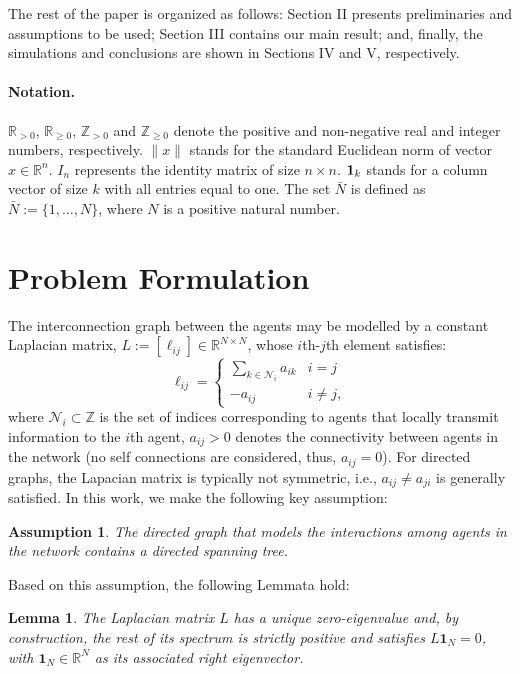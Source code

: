 \documentclass[journal,twoside]{IEEEtran}
\newtheorem{lemma}{Lemma}
\newtheorem{assumption}{Assumption}
\def\rea{\mathbb{R}}
\def\rea{\mathbb{R}}
\def\intnum{\mathbb{Z}}
\def\intnum{\mathbb{Z}}
\begin{document}
The rest of the paper is organized as follows: Section II presents   preliminaries and assumptions  to be used; Section III contains our main result; and, finally, the simulations and conclusions are shown in Sections IV and V, respectively. 
%
\paragraph{Notation.} $\rea_{>0}$, $\rea_{\geq 0}$, $\intnum_{>0}$ and $\intnum_{\geq 0}$ denote the positive and non-negative real and integer numbers, respectively. $\| x\|$ stands for the standard Euclidean norm of vector $x\in\rea^n$. $I_n$ represents the identity matrix of size $n\times n$. ${\bf1}_k$ stands for a column vector of size $k$ with all entries equal to one.  The set ${\bar N}$ is defined as ${\bar N}:=\{1,\dots,N\}$, where $N$ is a positive natural number.



\section{Problem Formulation}
The interconnection graph between the agents may be modelled by a constant Laplacian matrix, ${ L}:=[\ell_{ij}] \in{\mathbb{R}}^{N\times N}$, whose $i$th-$j$th element satisfies: 
\begin{equation}
\label{lap:eq}
{\ell _{ij}} = \left\{ {\begin{array}{*{20}{c}}
{\sum\limits_{k \in  \mathcal N_i} {{a_{ik}}} }&{i = j}\\
{ - {a_{ij}}}&{i \ne j},
\end{array}} \right.
\end{equation}
where $ \mathcal N_i\subset \mathbb{Z}$ is the set of indices corresponding to agents that locally transmit information to the $i$th agent, $a_{ij}>0$ denotes the connectivity between agents in the network (no self connections are considered, thus, $a_{ij}=0$). 
For directed graphs, the Lapacian matrix is typically not symmetric, i.e., $a_{ij} \not= a_{ji}$ is generally satisfied.
In this work, we make the following key assumption:
\begin{assumption}\em
\label{asp1}
The directed graph that models the interactions among agents in the network contains a directed spanning tree.
\end{assumption}

Based on this assumption, the following Lemmata hold:

\begin{lemma} \em
\label{lem1}
\cite{RENBEARD} The Laplacian matrix $L$ has a unique zero-eigenvalue and, by construction, the rest of its spectrum is strictly positive and satisfies $L \boldsymbol 1_N = 0$, with $\boldsymbol 1_N \in \rea^N$ as its associated right eigenvector. 
\end{lemma}
\end{document}

